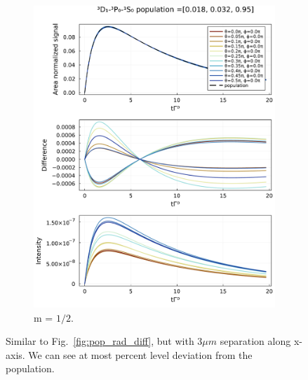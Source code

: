 \documentclass{article}
\begin{document}
\begin{figure}
\begin{subfigure}[b]{.45\textwidth}
        \includegraphics[width=\textwidth]{[4]|F_i=2.5,1.5,1.5,0.5|displacement=1.154,0.0,0.0|exc_frac=0.018,0.032|m_exc=0.5.jld2_int-pop.pdf}
        \caption{m = $1/2$.}
    \end{subfigure}
    \caption{\label{fig:pop_rad_diff_r12=3} Similar to Fig.~\ref{fig:pop_rad_diff}, but with 3$\mu m $ separation along x-axis. We can see at most percent level deviation from the population.}
\end{figure}
\end{document}
